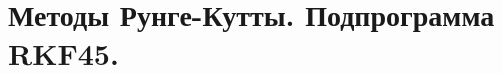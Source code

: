 \documentclass[../../calc-math-exam-2023.tex]{subfiles}
\begin{document}
    \section{Методы Рунге-Кутты. Подпрограмма \textbf{RKF45}.}\label{sec:ch26}
\end{document}
